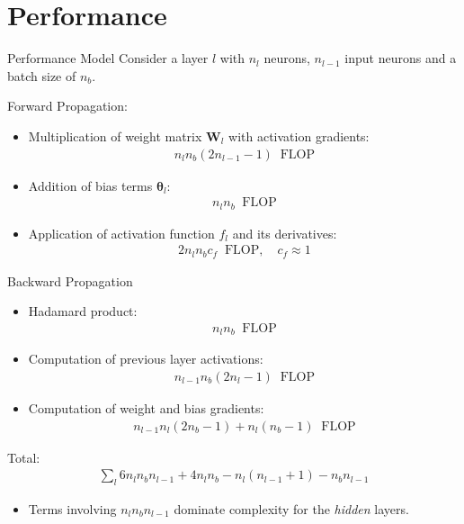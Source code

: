 \documentclass{beamer}
\begin{document}
\section{Performance}
\begin{frame}{Performance Model}
  Consider a layer $l$ with $n_l$ neurons, $n_{l-1}$ input neurons and a batch
  size of $n_b$.
  \begin{overprint}
  \begin{block}{Forward Propagation:}
    \begin{itemize}
    \item Multiplication of weight matrix $\mathbf{W}_l$ with activation gradients:
      \begin{align*}
n_l n_b (2n_{l-1} - 1) \: \text{ FLOP}
        \end{align*}
    \item Addition of bias terms $\boldsymbol{\theta}_l$:
      \begin{align*}
      n_l n_b \:  \text{ FLOP}
        \end{align*}
    \item Application of activation function $f_l$ and its derivatives:
   \begin{align*}
     2 n_l n_b c_f \:\text{ FLOP}, \quad c_f \approx 1
   \end{align*}
     \end{itemize}
   \end{block}
   \begin{block}{Backward Propagation}
    \begin{itemize}
    \item Hadamard product:
      \begin{align*}
        n_l n_b \: \text{ FLOP}
      \end{align*}
    \item Computation of previous layer activations:
      \begin{align*}
        n_{l-1} n_b (2 n_l - 1) \: \text{ FLOP}
      \end{align*}
    \item Computation of weight and bias gradients:
      \begin{align*}
        n_{l-1} n_l (2 n_b - 1) + n_l(n_b - 1) \: \text{ FLOP}
      \end{align*}
   \end{itemize}
   \end{block}
   \begin{block}{Total:}
      \begin{align*}
 \sum_l 6n_l n_b n_{l-1}  + 4 n_l n_b - n_l(n_{l-1} + 1) - n_bn_{l-1} 
      \end{align*}
      \begin{itemize}
      \item Terms involving $n_l n_b n_{l-1}$ dominate complexity for the \textit{hidden}
        layers.
      \end{itemize}
    \end{block}
  \end{overprint}
\end{frame}
\end{document}
